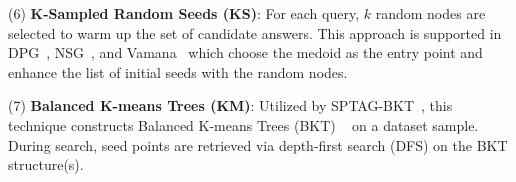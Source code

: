 \noindent (6) \textbf{K-Sampled Random Seeds (KS)}: 
For each query, \( k \) random nodes are selected to warm up the set of candidate answers. This approach is supported in DPG~\cite{dpg}, NSG~\cite{nsg}, and Vamana~\cite{vamana} which choose the medoid as the entry point and enhance the list of initial seeds with the random nodes. %

\noindent (7) \textbf{Balanced K-means Trees (KM)}: Utilized by SPTAG-BKT~\cite{SPTAG2}, this technique constructs Balanced K-means Trees (BKT) ~\cite{bkmtree} on a dataset sample. During search, seed points are retrieved via depth-first search (DFS) on the BKT structure(s).



